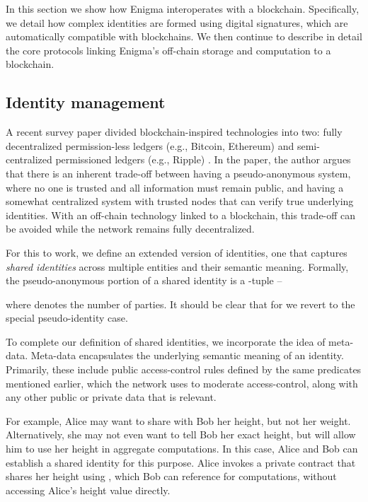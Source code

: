 \documentclass{article} \usepackage{nips13submit_e,times}
\begin{document}
In this section we show how Enigma interoperates with a blockchain. Specifically, we detail how complex identities are formed using digital signatures, which are automatically compatible with blockchains. We then continue to describe in detail the core protocols linking Enigma's off-chain storage and computation to a blockchain.



\subsection{Identity management}
\label{sec:identities}

A recent survey paper divided blockchain-inspired technologies into two: fully decentralized permission-less ledgers (e.g., Bitcoin, Ethereum) and semi-centralized permissioned ledgers (e.g., Ripple) \cite{consensusaas}. In the paper, the author argues that there is an inherent trade-off between having a pseudo-anonymous system, where no one is trusted and all information must remain public, and having a somewhat centralized system with trusted nodes that can verify true underlying identities. With an off-chain technology linked to a blockchain, this trade-off can be avoided while the network remains fully decentralized.

For this to work, we define an extended version of identities, one that captures \textit{shared identities} across multiple entities and their semantic meaning. Formally, the pseudo-anonymous portion of a shared identity is a -tuple -- 



where  denotes the number of parties. It should be clear that for  we revert to the special pseudo-identity case.

To complete our definition of shared identities, we incorporate the idea of meta-data. Meta-data encapsulates the underlying semantic meaning of an identity. Primarily, these include public access-control rules defined by the same predicates mentioned earlier, which the network uses to moderate access-control, along with any other public or private data that is relevant.

For example, Alice may want to share with Bob her height, but not her weight. Alternatively, she may not even want to tell Bob her exact height, but will allow him to use her height in aggregate computations. In this case, Alice and Bob can establish a shared identity for this purpose. Alice invokes a private contract that shares her height using , which Bob can reference for computations, without accessing Alice's height value directly. 
\end{document}

